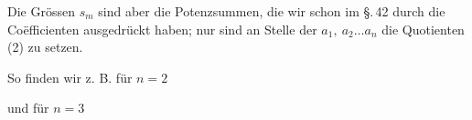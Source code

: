 
Die Gr\"ossen $s_m$ sind aber die Potenzsummen, die wir schon
im \S.\,42 durch die Co\"efficienten ausgedr\"uckt haben; nur sind an
Stelle der $a_1,\ a_2 \ldots a_n$ die Quotienten (2) zu setzen.

So finden wir z. B. f\"ur $n = 2$


und f\"ur $n = 3$

